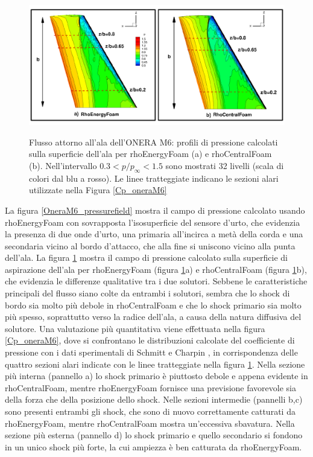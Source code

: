 \documentclass[a5paper]{sapthesis}
\begin{document}
	\begin{figure}[htp]
		\centering
		{\includegraphics[width=0.95\linewidth]{Figures/Cp_contours_oneram6_1}}  
		\caption{Flusso attorno all'ala dell'ONERA M6: profili di pressione calcolati sulla superficie dell'ala per rhoEnergyFoam (a) e rhoCentralFoam (b). Nell'intervallo $0.3 < p/p_\infty < 1.5$ sono mostrati 32 livelli  (scala di colori dal blu a rosso). Le linee tratteggiate indicano le sezioni alari utilizzate nella Figura \ref{Cp_oneraM6}}
		\label{Cp_contours_oneraM6}
	\end{figure}
	
	La figura \ref{OneraM6_pressurefield} mostra il campo di pressione calcolato usando rhoEnergyFoam con sovrapposta l'isosuperficie del sensore d'urto, che evidenzia la presenza di due onde d'urto, una primaria all'incirca a metà della corda e una secondaria vicino al bordo d'attacco, che alla fine si uniscono vicino alla punta dell'ala. La figura \ref{Cp_contours_oneraM6} mostra il campo di pressione calcolato sulla superficie di aspirazione dell'ala per rhoEnergyFoam (figura \ref{Cp_contours_oneraM6}a) e rhoCentralFoam (figura \ref{Cp_contours_oneraM6}b), che evidenzia le differenze qualitative tra i due solutori. Sebbene le caratteristiche principali del ﬂusso siano colte da entrambi i solutori, sembra che lo shock di bordo sia molto più debole in rhoCentralFoam e che lo shock primario sia molto più spesso, soprattutto verso la radice dell'ala, a causa della natura diffusiva del solutore. Una valutazione più quantitativa viene effettuata nella figura \ref{Cp_oneraM6}, dove si confrontano le distribuzioni calcolate del coefficiente di pressione con i dati sperimentali di Schmitt e Charpin \citep{schmitt1979pressure}, in corrispondenza delle quattro sezioni alari indicate con le linee tratteggiate nella figura \ref{Cp_contours_oneraM6}. Nella sezione più interna (pannello a) lo shock primario è piuttosto debole e appena evidente in rhoCentralFoam, mentre rhoEnergyFoam fornisce una previsione favorevole sia della forza che della posizione dello shock. Nelle sezioni intermedie (pannelli b,c) sono presenti entrambi gli shock, che sono di nuovo correttamente catturati da rhoEnergyFoam, mentre rhoCentralFoam mostra un'eccessiva sbavatura. Nella sezione più esterna (pannello d) lo shock primario e quello secondario si fondono in un unico shock più forte, la cui ampiezza è ben catturata da rhoEnergyFoam. 
	
\end{document}
